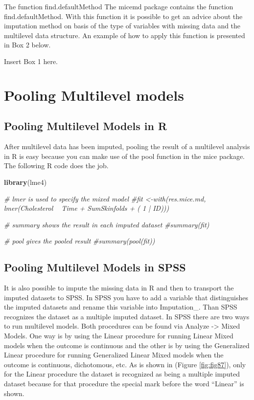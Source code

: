 \documentclass[]{book}
\newenvironment{Shaded}{\begin{snugshade}}{\end{snugshade}}
\newcommand{\KeywordTok}[1]{\textcolor[rgb]{0.13,0.29,0.53}{\textbf{#1}}}
\newcommand{\CommentTok}[1]{\textcolor[rgb]{0.56,0.35,0.01}{\textit{#1}}}
\newcommand{\NormalTok}[1]{#1}
\theoremstyle{definition}
\theoremstyle{definition}
\theoremstyle{definition}
\theoremstyle{remark}
\begin{document}
The function find.defaultMethod The micemd package contains the function
find.defaultMethod. With this function it is possible to get an advice
about the imputation method on basis of the type of variables with
missing data and the multilevel data structure. An example of how to
apply this function is presented in Box 2 below.

Insert Box 1 here.

\section{Pooling Multilevel models}\label{pooling-multilevel-models}

\subsection{Pooling Multilevel Models in
R}\label{pooling-multilevel-models-in-r}

After multilevel data has been imputed, pooling the result of a
multilevel analysis in R is easy because you can make use of the pool
function in the mice package. The following R code does the job.

\begin{Shaded}
\begin{Highlighting}[]
\KeywordTok{library}\NormalTok{(lme4)}

\CommentTok{# lmer is used to specify the mixed model}
\CommentTok{#fit <-with(res.mice.md, lmer(Cholesterol ~ Time + SumSkinfolds + ( 1 | ID)))}

\CommentTok{# summary shows the result in each imputed dataset}
\CommentTok{#summary(fit)}

\CommentTok{# pool gives the pooled result}
\CommentTok{#summary(pool(fit))}
\end{Highlighting}
\end{Shaded}

\subsection{Pooling Multilevel Models in
SPSS}\label{pooling-multilevel-models-in-spss}

It is also possible to impute the missing data in R and then to
transport the imputed datasets to SPSS. In SPSS you have to add a
variable that distinguishes the imputed datasets and rename this
variable into Imputation\_. Than SPSS recognizes the dataset as a
multiple imputed dataset. In SPSS there are two ways to run multilevel
models. Both procedures can be found via Analyze -\textgreater{} Mixed
Models. One way is by using the Linear procedure for running Linear
Mixed models when the outcome is continuous and the other is by using
the Generalized Linear procedure for running Generalized Linear Mixed
models when the outcome is continuous, dichotomous, etc. As is shown in
(Figure \ref{fig:fig87}), only for the Linear procedure the dataset is
recognized as being a multiple imputed dataset because for that
procedure the special mark before the word ``Linear'' is shown.
\end{document}
